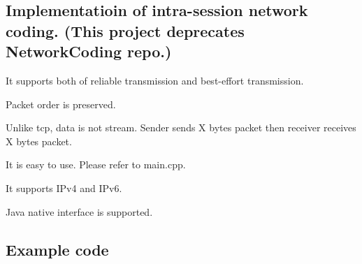 \subsection*{Implementatioin of intra-\/session network coding. (This project deprecates Network\+Coding repo.)}


\begin{DoxyEnumerate}
\item It supports both of reliable transmission and best-\/effort transmission.
\item Packet order is preserved.
\item Unlike tcp, data is not stream. Sender sends X bytes packet then receiver receives X bytes packet.
\item It is easy to use. Please refer to main.\+cpp.
\item It supports I\+Pv4 and I\+Pv6.
\item Java native interface is supported. \subsection*{Example code}
\end{DoxyEnumerate}



